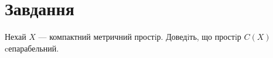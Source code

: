 \chapter{Завдання \theHchapter}

\begin{tcolorbox}[title=Завдання]
    Нехай $X$ — компактний метричний простiр. 
    Доведiть, що простiр $C(X)$ cепарабельний.
\end{tcolorbox}

